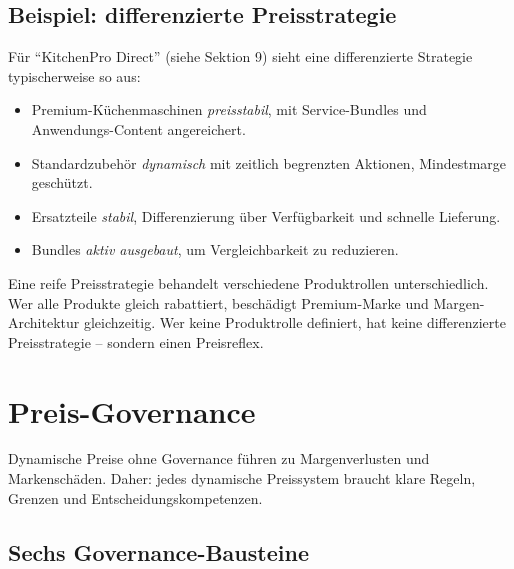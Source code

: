 \documentclass[11pt,a4paper,oneside]{article}
\begin{document}
\subsection{Beispiel: differenzierte Preisstrategie}

Für ``KitchenPro Direct'' (siehe Sektion 9) sieht eine differenzierte Strategie typischerweise so aus:

\begin{itemize}
  \item Premium-Küchenmaschinen \textrightarrow{} \emph{preisstabil}, mit Service-Bundles und Anwendungs-Content angereichert.
  \item Standardzubehör \textrightarrow{} \emph{dynamisch} mit zeitlich begrenzten Aktionen, Mindestmarge geschützt.
  \item Ersatzteile \textrightarrow{} \emph{stabil}, Differenzierung über Verfügbarkeit und schnelle Lieferung.
  \item Bundles \textrightarrow{} \emph{aktiv ausgebaut}, um Vergleichbarkeit zu reduzieren.
\end{itemize}

\begin{merkbox}
Eine reife Preisstrategie behandelt verschiedene Produktrollen unterschiedlich. Wer alle Produkte gleich rabattiert, beschädigt Premium-Marke und Margen-Architektur gleichzeitig. Wer keine Produktrolle definiert, hat keine differenzierte Preisstrategie -- sondern einen Preisreflex.
\end{merkbox}

\section{Preis-Governance}

Dynamische Preise ohne Governance führen zu Margenverlusten und Markenschäden. Daher: jedes dynamische Preissystem braucht klare Regeln, Grenzen und Entscheidungskompetenzen.

\subsection{Sechs Governance-Bausteine}
\end{document}
